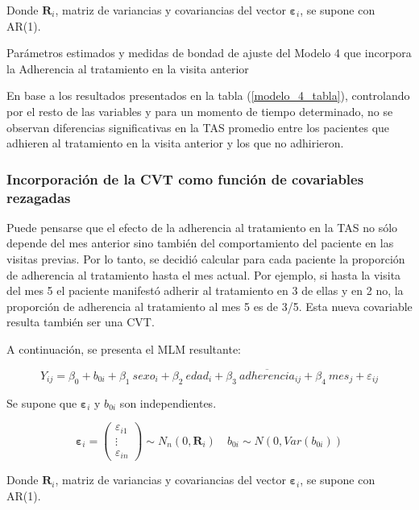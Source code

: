\documentclass[spanish]{article}
\numberwithin{figure}{subsection}
\numberwithin{equation}{subsection}
\numberwithin{table}{subsection}
\begin{document}
Donde $\bm{R}_i$, matriz de variancias y covariancias del vector
$\bm{\varepsilon}_{i}$, se supone con AR(1).

\begin{table}[H]
	\centering
	\caption{Parámetros estimados y medidas de bondad de ajuste del Modelo 4 que incorpora la Adherencia al tratamiento en la visita anterior}
	\label{modelo_4_tabla}
	
\end{table}

En base a los resultados presentados en la tabla (\ref{modelo_4_tabla}),
controlando por el resto de las variables y para un momento de tiempo
determinado, no se observan diferencias significativas en la TAS promedio entre
los pacientes que adhieren al tratamiento en la visita anterior y los que no
adhirieron.

\subsubsection{Incorporación de la CVT como función de covariables rezagadas}

Puede pensarse que el efecto de la adherencia al tratamiento en la TAS no sólo
depende del mes anterior sino también del comportamiento del paciente en las
visitas previas. Por lo tanto, se decidió calcular para cada paciente la
proporción de adherencia al tratamiento hasta el mes actual. Por ejemplo, si
hasta la visita del mes 5 el paciente manifestó adherir al tratamiento en 3 de
ellas y en 2 no, la proporción de adherencia al tratamiento al mes 5 es de 3/5.
Esta nueva covariable resulta también ser una CVT.

A continuación, se presenta el MLM resultante:

\begin{equation}
	\label{modelo_5}
	Y_{ij} = \beta_0 + b_{0i} + \beta_1\ sexo_i + \beta_2\ edad_i + \beta_3\ \overline{adherencia}_{ij}
	+ \beta_4\ mes_j + \varepsilon_{ij}
\end{equation}

Se supone que $\bm{\varepsilon}_i$ y $b_{0i}$ son independientes.

\[ 
	\bm{\varepsilon}_i = \begin{pmatrix} \varepsilon_{i1} \\ \vdots \\ \varepsilon_{in} \end{pmatrix} \sim N_{n}(0, \bm{R}_i)
	\quad
	b_{0i} \sim N(0, Var(b_{0i}))
\]

Donde $\bm{R}_i$, matriz de variancias y covariancias del vector
$\bm{\varepsilon}_{i}$, se supone con AR(1).
\end{document}
